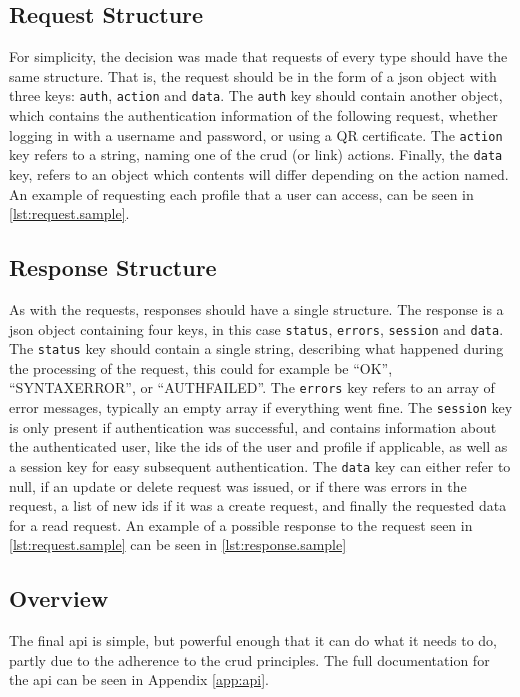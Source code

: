 \subsection{Request Structure}

For simplicity, the decision was made that requests of every type should have the same structure. That is, the request should be in the form of
a \ac{json} object with three keys: \texttt{auth}, \texttt{action} and \texttt{data}. The \texttt{auth} key should contain another object, which
contains the authentication information of the following request, whether logging in with a username and password, or using a QR certificate. The
\texttt{action} key refers to a string, naming one of the \ac{crud} (or link) actions. Finally, the \texttt{data} key, refers to an object which contents
will differ depending on the action named. An example of requesting each profile that a user can access, can be seen in \autoref{lst:request.sample}.



\subsection{Response Structure}

As with the requests, responses should have a single structure. The response is a \ac{json} object containing four keys, in this
case \texttt{status}, \texttt{errors}, \texttt{session} and \texttt{data}. The \texttt{status} key should contain a single string, describing what happened during the
processing of the request, this could for example be ``OK'', ``SYNTAXERROR'', or ``AUTHFAILED''. The \texttt{errors} key refers to an array of error
messages, typically an empty array if everything went fine. The \texttt{session} key is only present if authentication was successful, and contains information
about the authenticated user, like the ids of the user and profile if applicable, as well as a session key for easy subsequent authentication.  The \texttt{data} key
can either refer to null, if an update or delete request was issued, or if there was errors in the request, a list of new ids if it was a create request, and finally
the requested data for a read request. An example of a possible response to the request seen in \autoref{lst:request.sample} can be seen in \autoref{lst:response.sample}



\subsection{Overview}

The final \ac{api} is simple, but powerful enough that it can do what it needs to do, partly due to the adherence to the \ac{crud} principles. The full
documentation for the \ac{api} can be seen in Appendix \autoref{app:api}.
